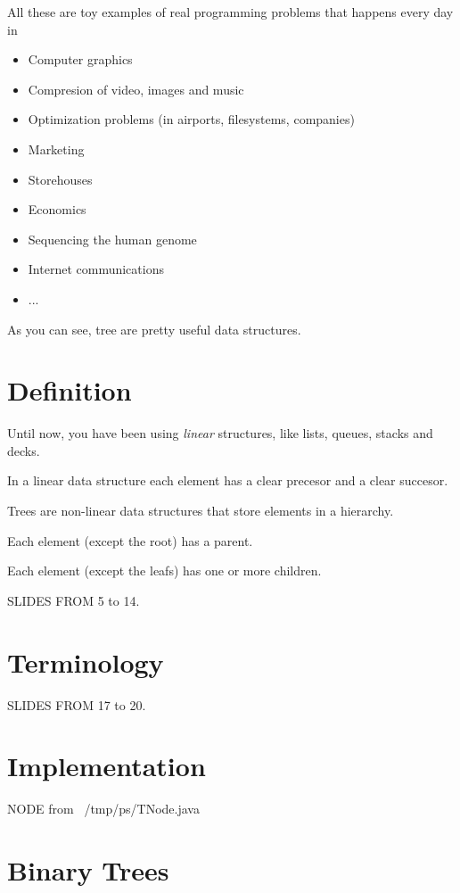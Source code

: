 \documentclass[a4paper, 9pt]{extarticle}
\newcommand{\separator}{\begin{center}%
\noindent\makebox[\linewidth]{\rule{0.75\paperwidth}{0.4pt}}%
\end{center}}
\begin{document}
\separator

All these are toy examples of real programming problems that happens every day in

\begin{itemize}
  \item Computer graphics
  \item Compresion of video, images and music
  \item Optimization problems (in airports, filesystems, companies)
  \item Marketing
  \item Storehouses
  \item Economics
  \item Sequencing the human genome
  \item Internet communications
  \item ...
\end{itemize}

As you can see, tree are pretty useful data structures.


\section{Definition}

Until now, you have been using \emph{linear} structures, like lists, queues, stacks and decks.

In a linear data structure each element has a clear precesor and a clear succesor.

Trees are non-linear data structures that store elements in a hierarchy.

Each element (except the root) has a parent.

Each element (except the leafs) has one or more children.

SLIDES FROM 5 to 14.



\section{Terminology}

SLIDES FROM 17 to 20.



\section{Implementation}

NODE from ~/tmp/ps/TNode.java





\section{Binary Trees}
\end{document}
